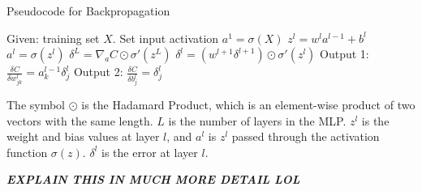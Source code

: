 \documentclass[11pt]{report}
\begin{document}
	\begin{algorithm}
		\caption{Pseudocode for Backpropagation}
		\label{alg:bg_gdBackprop}
		\begin{algorithmic}[1]
			\State Given: training set $X$.
			\State Set input activation $a^1=\sigma(X)$
			\State $z^l = w^l a^{l-1} +b^l$
			\State $a^l = \sigma(z^l)$ 
			\EndFor
			\State $\delta^L = \nabla_a C \odot \sigma '(z^L)$
			\State $\delta^l = (w^{l+1}\delta^{l+1}) \odot \sigma '(z^l)$
			\EndFor
			\State Output 1: $\frac{\delta C}{\delta w^{l}_{jk}} = a^{l-1}_{k}\delta^{l}_{j}$
			\State Output 2: $\frac{\delta C}{\delta b^{l}_{j}} = \delta^{l}_{j}$
			\EndProcedure
		\end{algorithmic}
	\end{algorithm}
	\par The symbol $\odot$ is the Hadamard Product, which is an element-wise product of two vectors with the same length. $L$ is the number of layers in the MLP. $z^l$ is the weight and bias values at layer $l$, and $a^l$ is $z^l$ passed through the activation function $\sigma(z)$. $\delta^l$ is the error at layer $l$.
	\par \textbf{\textit{ EXPLAIN THIS IN MUCH MORE DETAIL LOL}}
\end{document}
